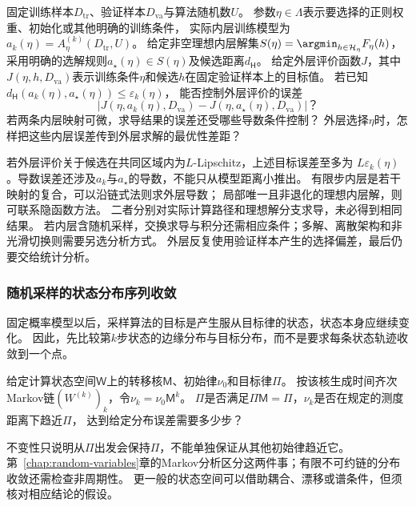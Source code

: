 \begin{mathproblem}[内层求解误差对外层目标与导数的影响]
  \label{question:future-nested-learning}
  固定训练样本$D_{\mathrm{tr}}$、验证样本$D_{\mathrm{va}}$与算法随机数$U$。
  参数$\eta\in\Lambda$表示要选择的正则权重、初始化或其他明确的训练条件，
  实际内层训练模型为$a_k(\eta)=A_\eta^{(k)}(D_{\mathrm{tr}},U)$。
  给定非空理想内层解集$S(\eta)=\argmin_{h\in\mathcal H_\eta}F_\eta(h)$，
  采用明确的选解规则$a_\star(\eta)\in S(\eta)$及候选距离$d_{\mathsf H}$。
  给定外层评价函数$J$，其中$J(\eta,h,D_{\mathrm{va}})$表示训练条件$\eta$和候选$h$在固定验证样本上的目标值。
  若已知$d_{\mathsf H}(a_k(\eta),a_\star(\eta))\leq\varepsilon_k(\eta)$，
  能否控制外层评价的误差
  \[
    \left|J(\eta,a_k(\eta),D_{\mathrm{va}})
          -J(\eta,a_\star(\eta),D_{\mathrm{va}})\right|\text{？}
  \]
  若两条内层映射可微，求导结果的误差还受哪些导数条件控制？
  外层选择$\eta$时，怎样把这些内层误差传到外层求解的最优性差距？
\end{mathproblem}

若外层评价关于候选在共同区域内为$L$-Lipschitz，上述目标误差至多为
$L\varepsilon_k(\eta)$。导数误差还涉及$a_k$与$a_\star$的导数，不能只从模型距离小推出。
有限步内层是若干映射的复合，可以沿链式法则求外层导数；
局部唯一且非退化的理想内层解，则可联系隐函数方法。
二者分别对实际计算路径和理想解分支求导，未必得到相同结果。
若内层含随机采样，交换求导与积分还需相应条件；多解、离散架构和非光滑切换则需要另选分析方式。
外层反复使用验证样本产生的选择偏差，最后仍要交给统计分析。

\subsubsection{随机采样的状态分布序列收敛}
\label{sec:future-analysis-sampling-dynamics}

固定概率模型以后，采样算法的目标是产生服从目标律的状态，状态本身应继续变化。
因此，先比较第$k$步状态的边缘分布与目标分布，而不是要求每条状态轨迹收敛到一个点。

\begin{mathproblem}[采样状态分布是否趋近目标分布]
  \label{question:future-sampling-dynamics}
  给定计算状态空间$\mathsf W$上的转移核$\mathsf M$、初始律$\nu_0$和目标律$\Pi$。
  按该核生成时间齐次Markov链$(W^{(k)})_k$，令$\nu_k=\nu_0\mathsf M^k$。
  $\Pi$是否满足$\Pi\mathsf M=\Pi$，$\nu_k$是否在规定的测度距离下趋近$\Pi$，
  达到给定分布误差需要多少步？
\end{mathproblem}

不变性只说明从$\Pi$出发会保持$\Pi$，不能单独保证从其他初始律趋近它。
第~\ref{chap:random-variables}章的Markov分析区分这两件事；有限不可约链的分布收敛还需检查非周期性。
更一般的状态空间可以借助耦合、漂移或谱条件，但须核对相应结论的假设。

